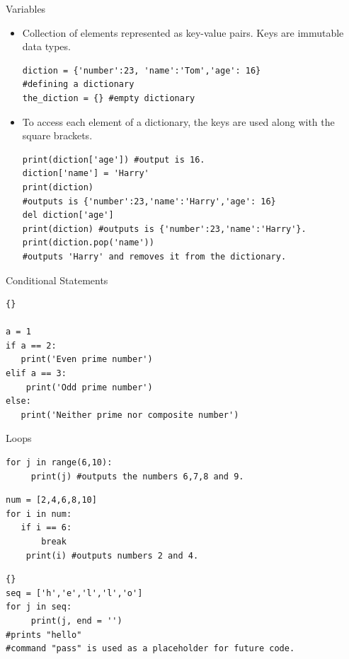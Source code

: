 \documentclass{beamer}
\begin{document}
\begin{frame}[fragile]{Variables}
\begin{itemize}
\item Collection of elements represented as key-value pairs. Keys are immutable data types.

\begin{lstlisting}
diction = {'number':23, 'name':'Tom','age': 16} 
#defining a dictionary
the_diction = {} #empty dictionary
\end{lstlisting}

\item To access each element of a dictionary, the keys are used along with the square brackets.

\begin{lstlisting}
print(diction['age']) #output is 16.
diction['name'] = 'Harry'
print(diction)
#outputs is {'number':23,'name':'Harry','age': 16}
del diction['age']
print(diction) #outputs is {'number':23,'name':'Harry'}.
print(diction.pop('name')) 
#outputs 'Harry' and removes it from the dictionary.

\end{lstlisting}
\end{itemize}
    
\end{frame}


\begin{frame}[fragile]{Conditional Statements}

\begin{lstlisting}{}

a = 1
if a == 2:
   print('Even prime number')
elif a == 3:
    print('Odd prime number')
else:
   print('Neither prime nor composite number')
\end{lstlisting}
\end{frame}


\begin{frame}[fragile]{Loops}

\begin{lstlisting}
for j in range(6,10):
     print(j) #outputs the numbers 6,7,8 and 9.
\end{lstlisting}


\begin{lstlisting}
num = [2,4,6,8,10]
for i in num:
   if i == 6:
       break
    print(i) #outputs numbers 2 and 4.
\end{lstlisting}

\begin{lstlisting}{}
seq = ['h','e','l','l','o']
for j in seq:
     print(j, end = '')
#prints "hello"
#command "pass" is used as a placeholder for future code.
\end{lstlisting}

\end{frame}
\end{document}
